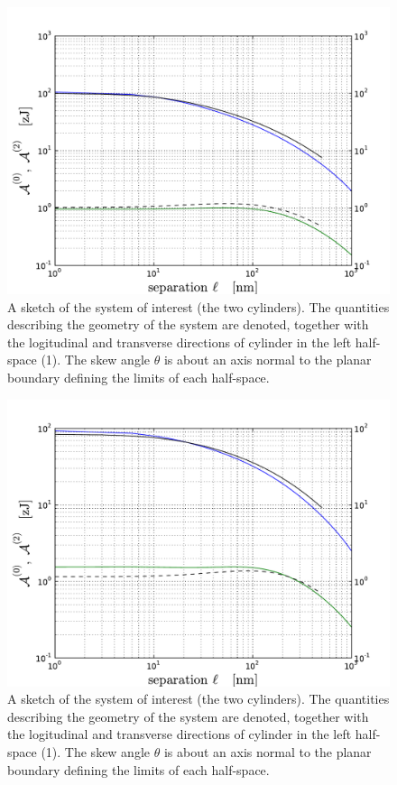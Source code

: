 \documentclass[onecolumn,letterpaper,amsmath,amssymb,floatfix,aps,superscriptaddress]{revtex4}
\begin{document}
\begin{figure}
\centerline{\includegraphics[width=12cm]{140309_65w65_GH_skew_ret_A0_A2.pdf}}
\caption{A sketch of the system of interest (the two cylinders). The quantities describing the geometry of the system are 
denoted, together with the logitudinal and transverse directions of cylinder in the left half-space (1). The skew angle $\theta$ is about an axis normal to the planar boundary defining the limits of each half-space.
}
\label{fig:sketch}
\end{figure}

\begin{figure}
\centerline{\includegraphics[width= 12cm]{140309_91w91_GH_skew_ret_A0_A2.pdf}}
\caption{A sketch of the system of interest (the two cylinders). The quantities describing the geometry of the system are 
denoted, together with the logitudinal and transverse directions of cylinder in the left half-space (1). The skew angle $\theta$ is about an axis normal to the planar boundary defining the limits of each half-space.
}
\label{fig:sketch}
\end{figure}
\end{document}
